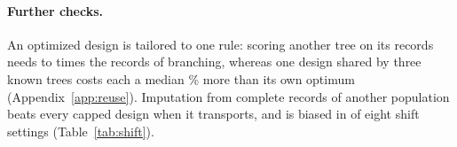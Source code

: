 \nMisspecSentence{} \nAuditParagraph

\paragraph{Further checks.}
An optimized design is tailored to one rule: scoring another tree on its records needs \nReuseMin{} to \nReuseMax{} times the records of branching, whereas one design shared by three known trees costs each a median \nJointPenMed\% more than its own optimum (Appendix~\ref{app:reuse}). Imputation from complete records of another population beats every capped design when it transports, and is biased in \nImpBadN{} of eight shift settings (Table~\ref{tab:shift}).

